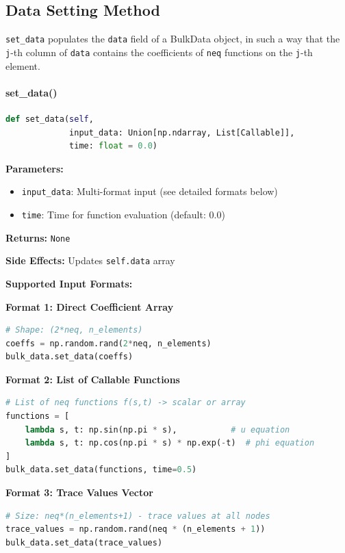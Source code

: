 \subsection{Data Setting Method}
\label{subsec:set_data_method}
{\tt set\_data} populates the {\tt data} field of a BulkData object, in such a way that the {\tt j}-th column of {\tt data} contains the coefficients of {\tt neq} functions on the {\tt j}-th element.


\paragraph{set\_data()}\leavevmode
\begin{lstlisting}[language=Python, caption=Set Data Method]
def set_data(self, 
             input_data: Union[np.ndarray, List[Callable]], 
             time: float = 0.0)
\end{lstlisting}

\textbf{Parameters:}
\begin{itemize}
    \item \texttt{input\_data}: Multi-format input (see detailed formats below)
    \item \texttt{time}: Time for function evaluation (default: 0.0)
\end{itemize}

\textbf{Returns:} \texttt{None}

\textbf{Side Effects:} Updates \texttt{self.data} array

\textbf{Supported Input Formats:}

\textbf{Format 1: Direct Coefficient Array}
\begin{lstlisting}[language=Python, caption=Direct Array Input]
# Shape: (2*neq, n_elements)
coeffs = np.random.rand(2*neq, n_elements)
bulk_data.set_data(coeffs)
\end{lstlisting}

\textbf{Format 2: List of Callable Functions}
\begin{lstlisting}[language=Python, caption=Function List Input]
# List of neq functions f(s,t) -> scalar or array
functions = [
    lambda s, t: np.sin(np.pi * s),           # u equation
    lambda s, t: np.cos(np.pi * s) * np.exp(-t)  # phi equation
]
bulk_data.set_data(functions, time=0.5)
\end{lstlisting}

\textbf{Format 3: Trace Values Vector}
\begin{lstlisting}[language=Python, caption=Trace Vector Input]
# Size: neq*(n_elements+1) - trace values at all nodes
trace_values = np.random.rand(neq * (n_elements + 1))
bulk_data.set_data(trace_values)
\end{lstlisting}

